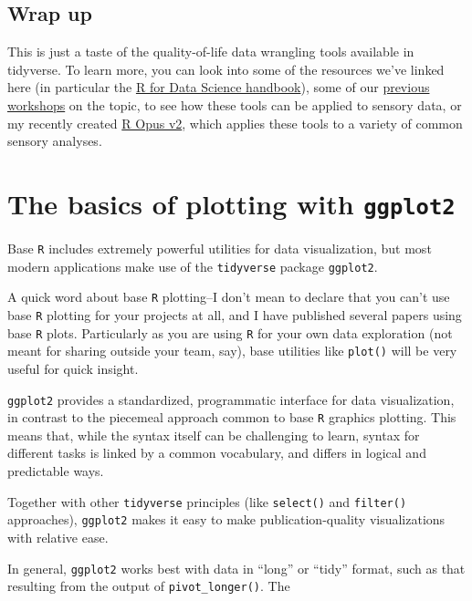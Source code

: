 \documentclass[
]{book}
\begin{document}
\hypertarget{wrap-up}{%
\section{Wrap up}\label{wrap-up}}

This is just a taste of the quality-of-life data wrangling tools available in tidyverse. To learn more, you can look into some of the resources we've linked here (in particular the \href{https://r4ds.hadley.nz/}{R for Data Science handbook}), some of our \href{https://jlahne.github.io/eurosense-tutorial-2022/}{previous} \href{https://lhami.github.io/pangborn-r-tutorial-2023/}{workshops} on the topic, to see how these tools can be applied to sensory data, or my recently created \href{https://jlahne.github.io/r-opus-v2/}{R Opus v2}, which applies these tools to a variety of common sensory analyses.

\hypertarget{the-basics-of-plotting-with-ggplot2}{%
\chapter{\texorpdfstring{The basics of plotting with \texttt{ggplot2}}{The basics of plotting with ggplot2}}\label{the-basics-of-plotting-with-ggplot2}}

Base \texttt{R} includes extremely powerful utilities for data visualization, but most modern applications make use of the \texttt{tidyverse} package \texttt{ggplot2}.

A quick word about base \texttt{R} plotting--I don't mean to declare that you can't use base \texttt{R} plotting for your projects at all, and I have published several papers using base \texttt{R} plots. Particularly as you are using \texttt{R} for your own data exploration (not meant for sharing outside your team, say), base utilities like \texttt{plot()} will be very useful for quick insight.

\texttt{ggplot2} provides a standardized, programmatic interface for data visualization, in contrast to the piecemeal approach common to base \texttt{R} graphics plotting. This means that, while the syntax itself can be challenging to learn, syntax for different tasks is linked by a common vocabulary, and differs in logical and predictable ways.

Together with other \texttt{tidyverse} principles (like \texttt{select()} and \texttt{filter()} approaches), \texttt{ggplot2} makes it easy to make publication-quality visualizations with relative ease.

In general, \texttt{ggplot2} works best with data in ``long'' or ``tidy'' format, such as that resulting from the output of \texttt{pivot\_longer()}. The
\end{document}
